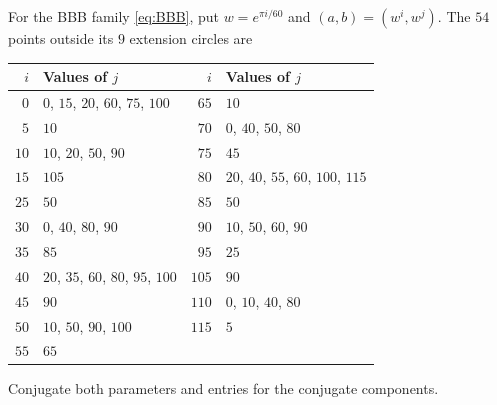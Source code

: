 \documentclass[11pt,a4paper]{article}
\theoremstyle{plain}
\theoremstyle{definition}
\numberwithin{equation}{section}
\begin{document}
\label{app:bbbpoints}
For the BBB family \eqref{eq:BBB}, put $w=e^{\pi i/60}$ and $(a,b)=(w^i,w^j)$. The $54$ points outside its $9$ extension circles are
\begin{longtable}{rl@{\qquad}rl}\toprule $i$ & Values of $j$ & $i$ & Values of $j$\\\midrule\endhead
$0$&$0$, $15$, $20$, $60$, $75$, $100$&$65$&$10$\\
$5$&$10$&$70$&$0$, $40$, $50$, $80$\\
$10$&$10$, $20$, $50$, $90$&$75$&$45$\\
$15$&$105$&$80$&$20$, $40$, $55$, $60$, $100$, $115$\\
$25$&$50$&$85$&$50$\\
$30$&$0$, $40$, $80$, $90$&$90$&$10$, $50$, $60$, $90$\\
$35$&$85$&$95$&$25$\\
$40$&$20$, $35$, $60$, $80$, $95$, $100$&$105$&$90$\\
$45$&$90$&$110$&$0$, $10$, $40$, $80$\\
$50$&$10$, $50$, $90$, $100$&$115$&$5$\\
$55$&$65$&&\\
\bottomrule\end{longtable}
Conjugate both parameters and entries for the conjugate components.
\end{document}
